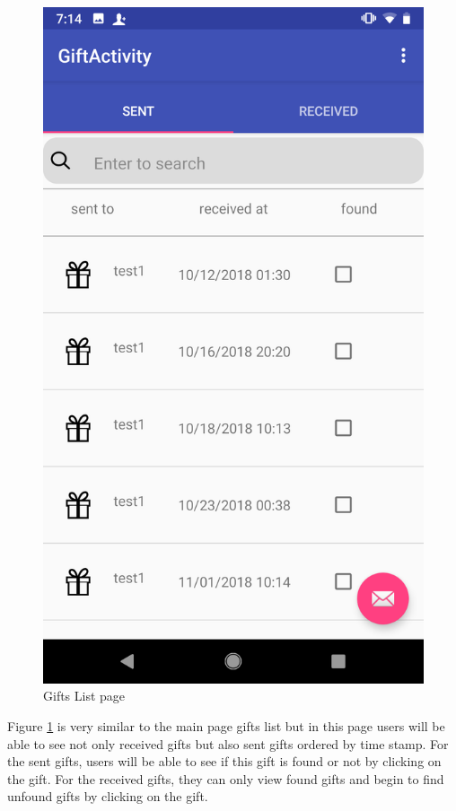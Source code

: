 \begin{figure}[htb]
\centering
\includegraphics[width=.5\textwidth]{section03/assets/GiftsList.png}
\caption[Short Caption 2]{\label{GiftsListUI}Gifts List page}
\end{figure}
\par Figure \ref{GiftsListUI} is very similar to the main page gifts list but in this page users will be able to see not only received gifts but also sent gifts ordered by time stamp. For the sent gifts, users will be able to see if this gift is found or not by clicking on the gift. For the received gifts, they can only view found gifts and begin to find unfound gifts by clicking on the gift. 


